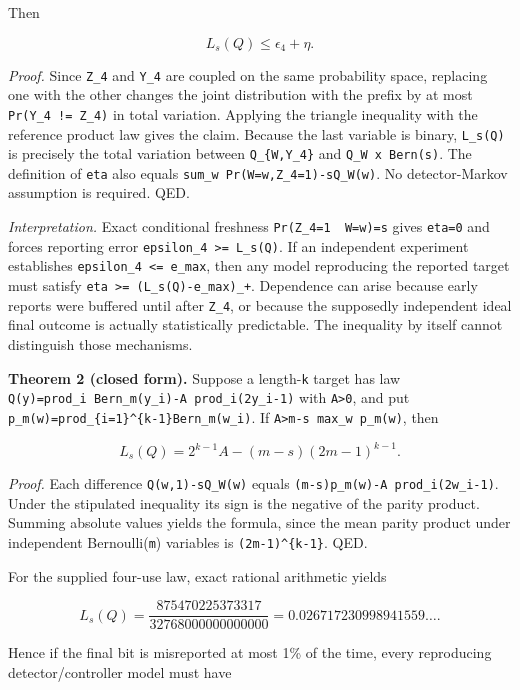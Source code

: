 \documentclass[
  10pt,
  a4paper,
]{article}
\begin{document}
Then

\[
 \boxed{L_s(Q)\le\epsilon_4+\eta.}
\]

\emph{Proof.} Since \texttt{Z\_4} and \texttt{Y\_4} are coupled on the same probability space, replacing one with the other changes the joint distribution with the prefix by at most \texttt{Pr(Y\_4\ !=\ Z\_4)} in total variation. Applying the triangle inequality with the reference product law gives the claim. Because the last variable is binary, \texttt{L\_s(Q)} is precisely the total variation between \texttt{Q\_\{W,Y\_4\}} and \texttt{Q\_W\ x\ Bern(s)}. The definition of \texttt{eta} also equals \texttt{sum\_w\ \textbar{}Pr(W=w,Z\_4=1)-sQ\_W(w)\textbar{}}. No detector-Markov assumption is required. QED.

\emph{Interpretation.} Exact conditional freshness \texttt{Pr(Z\_4=1\ \textbar{}\ W=w)=s} gives \texttt{eta=0} and forces reporting error \texttt{epsilon\_4\ \textgreater{}=\ L\_s(Q)}. If an independent experiment establishes \texttt{epsilon\_4\ \textless{}=\ e\_max}, then any model reproducing the reported target must satisfy \texttt{eta\ \textgreater{}=\ (L\_s(Q)-e\_max)\_+}. Dependence can arise because early reports were buffered until after \texttt{Z\_4}, or because the supposedly independent ideal final outcome is actually statistically predictable. The inequality by itself cannot distinguish those mechanisms.

\textbf{Theorem 2 (closed form).} Suppose a length-\texttt{k} target has law \texttt{Q(y)=prod\_i\ Bern\_m(y\_i)-A\ prod\_i(2y\_i-1)} with \texttt{A\textgreater{}0}, and put \texttt{p\_m(w)=prod\_\{i=1\}\^{}\{k-1\}Bern\_m(w\_i)}. If \texttt{A\textgreater{}\textbar{}m-s\textbar{}\ max\_w\ p\_m(w)}, then

\[
 \boxed{L_s(Q)=2^{k-1}A-(m-s)(2m-1)^{k-1}.}
\]

\emph{Proof.} Each difference \texttt{Q(w,1)-sQ\_W(w)} equals \texttt{(m-s)p\_m(w)-A\ prod\_i(2w\_i-1)}. Under the stipulated inequality its sign is the negative of the parity product. Summing absolute values yields the formula, since the mean parity product under independent Bernoulli(\texttt{m}) variables is \texttt{(2m-1)\^{}\{k-1\}}. QED.

For the supplied four-use law, exact rational arithmetic yields

\[
 \boxed{L_s(Q)=\frac{875470225373317}{32768000000000000}
        =0.026717230998941559\ldots .}
\]

Hence if the final bit is misreported at most 1\% of the time, every reproducing detector/controller model must have
\end{document}
